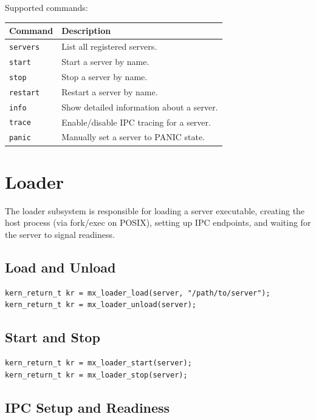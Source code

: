 \documentclass[a4paper,11pt]{article}
\begin{document}
Supported commands:

\begin{center}
\begin{tabularx}{\textwidth}{|l|X|}
\hline
\textbf{Command} & \textbf{Description} \\
\hline
\texttt{servers}   & List all registered servers. \\
\texttt{start}     & Start a server by name. \\
\texttt{stop}      & Stop a server by name. \\
\texttt{restart}   & Restart a server by name. \\
\texttt{info}      & Show detailed information about a server. \\
\texttt{trace}     & Enable/disable IPC tracing for a server. \\
\texttt{panic}     & Manually set a server to PANIC state. \\
\hline
\end{tabularx}
\end{center}

\section{Loader}

The loader subsystem is responsible for loading a server executable,
creating the host process (via fork/exec on POSIX), setting up IPC
endpoints, and waiting for the server to signal readiness.

\subsection{Load and Unload}

\begin{lstlisting}
kern_return_t kr = mx_loader_load(server, "/path/to/server");
kern_return_t kr = mx_loader_unload(server);
\end{lstlisting}

\subsection{Start and Stop}

\begin{lstlisting}
kern_return_t kr = mx_loader_start(server);
kern_return_t kr = mx_loader_stop(server);
\end{lstlisting}

\subsection{IPC Setup and Readiness}
\end{document}
